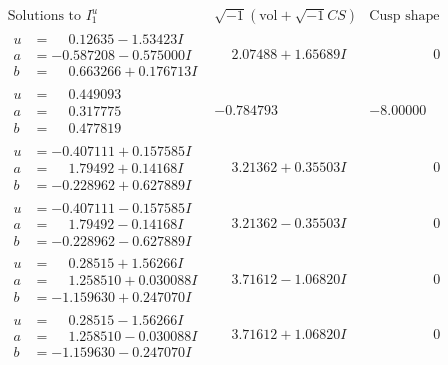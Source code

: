 \documentclass[1p]{elsarticle_modified}
\theoremstyle{definition}
\newcommand{\I}{\sqrt{-1}}
\begin{document}
$$\begin{array}{c|c|c}
\text{Solutions to }I^u_{1}& \I (\text{vol} + \sqrt{-1}CS) & \text{Cusp shape}\\
 \hline 
\begin{aligned}
u &= \phantom{-}0.12635 - 1.53423 I \\
a &= -0.587208 - 0.575000 I \\
b &= \phantom{-}0.663266 + 0.176713 I\end{aligned}
 & \phantom{-}2.07488 + 1.65689 I & \phantom{-0.000000 } 0 \\ \hline\begin{aligned}
u &= \phantom{-}0.449093\phantom{ +0.000000I} \\
a &= \phantom{-}0.317775\phantom{ +0.000000I} \\
b &= \phantom{-}0.477819\phantom{ +0.000000I}\end{aligned}
 & -0.784793\phantom{ +0.000000I} & -8.00000\phantom{ +0.000000I} \\ \hline\begin{aligned}
u &= -0.407111 + 0.157585 I \\
a &= \phantom{-}1.79492 + 0.14168 I \\
b &= -0.228962 + 0.627889 I\end{aligned}
 & \phantom{-}3.21362 + 0.35503 I & \phantom{-0.000000 } 0 \\ \hline\begin{aligned}
u &= -0.407111 - 0.157585 I \\
a &= \phantom{-}1.79492 - 0.14168 I \\
b &= -0.228962 - 0.627889 I\end{aligned}
 & \phantom{-}3.21362 - 0.35503 I & \phantom{-0.000000 } 0 \\ \hline\begin{aligned}
u &= \phantom{-}0.28515 + 1.56266 I \\
a &= \phantom{-}1.258510 + 0.030088 I \\
b &= -1.159630 + 0.247070 I\end{aligned}
 & \phantom{-}3.71612 - 1.06820 I & \phantom{-0.000000 } 0 \\ \hline\begin{aligned}
u &= \phantom{-}0.28515 - 1.56266 I \\
a &= \phantom{-}1.258510 - 0.030088 I \\
b &= -1.159630 - 0.247070 I\end{aligned}
 & \phantom{-}3.71612 + 1.06820 I & \phantom{-0.000000 } 0 \\ \hline\begin{aligned}

\end{aligned}
\end{array}$$
\end{document}
